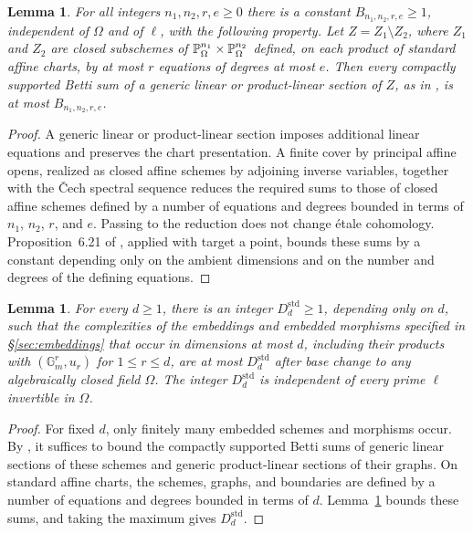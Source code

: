 \documentclass[12pt,reqno]{amsart}
\theoremstyle{definition}
\theoremstyle{plain}
\newtheorem{lem}[para]{Lemma}
\theoremstyle{definition}
\theoremstyle{remark}
\newcommand{\bbG}{\mathbb{G}}  \newcommand{\bbH}{\mathbb{H}}
\newcommand{\Gm}{\bbG_m}
\begin{document}
\begin{lem}
\label{lem:betti-presentation}
For all integers \(n_1,n_2,r,e\ge0\) there is a constant \(B_{n_1,n_2,r,e}\ge1\), independent of
\(\Omega\) and of \(\ell\), with the following property.  Let \(Z=Z_1\setminus Z_2\), where \(Z_1\) and
\(Z_2\) are closed subschemes of \(\mathbb{P}^{n_1}_\Omega\times\mathbb{P}^{n_2}_\Omega\) defined, on each product
of standard affine charts, by at most \(r\) equations of degrees at most \(e\).  Then every compactly
supported Betti sum of a generic linear or product-linear section of \(Z\), as in
\cite[Defs.~6.3, 6.6]{SFFK23}, is at most \(B_{n_1,n_2,r,e}\).
\end{lem}

\begin{proof}
A generic linear or product-linear section imposes additional linear equations and preserves the chart
presentation.  A finite cover by principal affine opens, realized as closed affine schemes by adjoining
inverse variables, together with the \v{C}ech spectral sequence reduces the required sums to those of
closed affine schemes defined by a number of equations and degrees bounded in terms of \(n_1\),
\(n_2\), \(r\), and \(e\).  Passing to the reduction does not change \'etale cohomology.
Proposition~6.21 of \cite{SFFK23}, applied with target a point, bounds these sums by a constant
depending only on the ambient dimensions and on the number and degrees of the defining equations.
\end{proof}

\begin{lem}
\label{lem:standard-geometric-complexity}
For every \(d\ge1\), there is an integer \(D_d^{\mathrm{std}}\ge1\), depending only on \(d\), such that
the complexities of the embeddings and embedded morphisms specified in \S\ref{sec:embeddings} that occur
in dimensions at most \(d\), including their products with \((\Gm^r,u_r)\) for \(1\le r\le d\), are at
most \(D_d^{\mathrm{std}}\) after base change to any algebraically closed field \(\Omega\).  The integer
\(D_d^{\mathrm{std}}\) is independent of every prime \(\ell\) invertible in \(\Omega\).
\end{lem}

\begin{proof}
For fixed \(d\), only finitely many embedded schemes and morphisms occur.  By
\cite[Def.~6.6]{SFFK23}, it suffices to bound the compactly supported Betti sums of generic linear
sections of these schemes and generic product-linear sections of their graphs.  On standard affine
charts, the schemes, graphs, and boundaries are defined by a number of equations and degrees bounded in
terms of \(d\).  Lemma~\ref{lem:betti-presentation} bounds these sums, and taking the maximum gives
\(D_d^{\mathrm{std}}\).
\end{proof}
\end{document}

